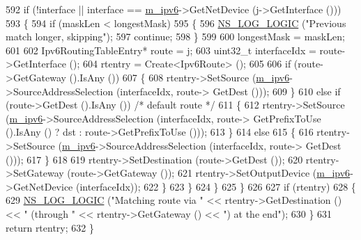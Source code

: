\begin{DoxyCode}
592               \textcolor{keywordflow}{if} (!interface || interface == \hyperlink{classns3_1_1RipNg_aca7a023799ce2004499a826ba5d5d3fe}{m\_ipv6}->GetNetDevice (j->GetInterface ()))
593                 \{
594                   \textcolor{keywordflow}{if} (maskLen < longestMask)
595                     \{
596                       \hyperlink{group__logging_ga88acd260151caf2db9c0fc84997f45ce}{NS\_LOG\_LOGIC} (\textcolor{stringliteral}{"Previous match longer, skipping"});
597                       \textcolor{keywordflow}{continue};
598                     \}
599 
600                   longestMask = maskLen;
601 
602                   Ipv6RoutingTableEntry* route = j;
603                   uint32\_t interfaceIdx = route->GetInterface ();
604                   rtentry = Create<Ipv6Route> ();
605 
606                   \textcolor{keywordflow}{if} (route->GetGateway ().IsAny ())
607                     \{
608                       rtentry->SetSource (\hyperlink{classns3_1_1RipNg_aca7a023799ce2004499a826ba5d5d3fe}{m\_ipv6}->SourceAddressSelection (interfaceIdx, route->
      GetDest ()));
609                     \}
610                   \textcolor{keywordflow}{else} \textcolor{keywordflow}{if} (route->GetDest ().IsAny ()) \textcolor{comment}{/* default route */}
611                     \{
612                       rtentry->SetSource (\hyperlink{classns3_1_1RipNg_aca7a023799ce2004499a826ba5d5d3fe}{m\_ipv6}->SourceAddressSelection (interfaceIdx, route->
      GetPrefixToUse ().IsAny () ? dst : route->GetPrefixToUse ()));
613                     \}
614                   \textcolor{keywordflow}{else}
615                     \{
616                       rtentry->SetSource (\hyperlink{classns3_1_1RipNg_aca7a023799ce2004499a826ba5d5d3fe}{m\_ipv6}->SourceAddressSelection (interfaceIdx, route->
      GetDest ()));
617                     \}
618 
619                   rtentry->SetDestination (route->GetDest ());
620                   rtentry->SetGateway (route->GetGateway ());
621                   rtentry->SetOutputDevice (\hyperlink{classns3_1_1RipNg_aca7a023799ce2004499a826ba5d5d3fe}{m\_ipv6}->GetNetDevice (interfaceIdx));
622                 \}
623             \}
624         \}
625     \}
626 
627   \textcolor{keywordflow}{if} (rtentry)
628     \{
629       \hyperlink{group__logging_ga88acd260151caf2db9c0fc84997f45ce}{NS\_LOG\_LOGIC} (\textcolor{stringliteral}{"Matching route via "} << rtentry->GetDestination () << \textcolor{stringliteral}{" (through "} << 
      rtentry->GetGateway () << \textcolor{stringliteral}{") at the end"});
630     \}
631   \textcolor{keywordflow}{return} rtentry;
632 \}
\end{DoxyCode}


